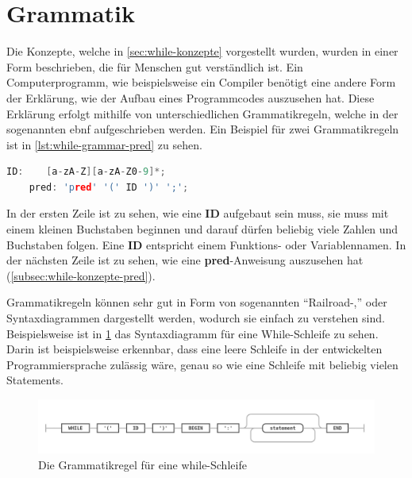 \section{Grammatik} \label{sec:while-grammar}
Die Konzepte, welche in \cref{sec:while-konzepte} vorgestellt wurden, wurden in einer Form beschrieben, die für Menschen gut verständlich ist. Ein Computerprogramm, wie beispielsweise ein Compiler benötigt eine andere Form der Erklärung, wie der Aufbau eines Programmcodes auszusehen hat. Diese Erklärung erfolgt mithilfe von unterschiedlichen Grammatikregeln, welche in der sogenannten \ac{ebnf} aufgeschrieben werden. Ein Beispiel für zwei Grammatikregeln ist in \cref{lst:while-grammar-pred} zu sehen.

\begin{lstlisting}[language=c, caption=Zwei einfache Grammatikregel, label={lst:while-grammar-pred}]
	ID:    [a-zA-Z][a-zA-Z0-9]*;
	pred: 'pred' '(' ID ')' ';';
\end{lstlisting}

In der ersten Zeile ist zu sehen, wie eine \textbf{ID} aufgebaut sein muss, sie muss mit einem kleinen Buchstaben beginnen und darauf dürfen beliebig viele Zahlen und Buchstaben folgen. Eine \textbf{ID} entspricht einem Funktions- oder Variablennamen. In der nächsten Zeile ist zu sehen, wie eine \textbf{pred}-Anweisung auszusehen hat (\cref{subsec:while-konzepte-pred}).

Grammatikregeln können sehr gut in Form von sogenannten \enquote{Railroad-,} oder {Syntaxdiagrammen} dargestellt werden, wodurch sie einfach zu verstehen sind. Beispielsweise ist in \cref{pic:WhileRegelWhile} das Syntaxdiagramm für eine While-Schleife zu sehen. Darin ist beispielsweise erkennbar, dass eine leere Schleife in der entwickelten Programmiersprache zulässig wäre, genau so wie eine Schleife mit beliebig vielen Statements.

\begin{figure}[h!]
	\centering
	\includegraphics[width=14cm]{content/pictures/while.png}
	\caption{Die Grammatikregel für eine while-Schleife}
	\label{pic:WhileRegelWhile}
\end{figure}



